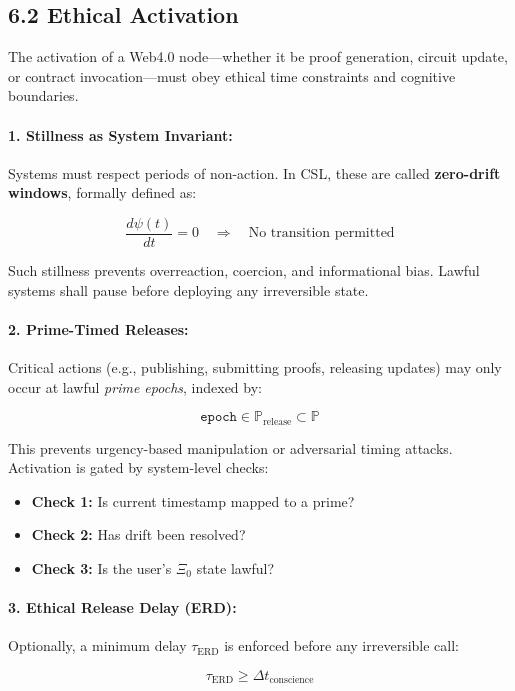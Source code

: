 \documentclass[12]{amsart}
\theoremstyle{plain}
\begin{document}
\subsection{6.2 Ethical Activation}
\label{subsec:ethical_activation}

The activation of a Web4.0 node—whether it be proof generation, circuit update, or contract invocation—must obey ethical time constraints and cognitive boundaries.

\paragraph{1. Stillness as System Invariant:}
Systems must respect periods of non-action. In CSL, these are called \textbf{zero-drift windows}, formally defined as:

\[
\frac{d\psi(t)}{dt} = 0 \quad \Rightarrow \quad \text{No transition permitted}
\]

Such stillness prevents overreaction, coercion, and informational bias. Lawful systems shall pause before deploying any irreversible state.

\paragraph{2. Prime-Timed Releases:}
Critical actions (e.g., publishing, submitting proofs, releasing updates) may only occur at lawful \textit{prime epochs}, indexed by:

\[
\texttt{epoch} \in \mathbb{P}_{\text{release}} \subset \mathbb{P}
\]

This prevents urgency-based manipulation or adversarial timing attacks. Activation is gated by system-level checks:

\begin{itemize}
  \item \textbf{Check 1:} Is current timestamp mapped to a prime?
  \item \textbf{Check 2:} Has drift been resolved?
  \item \textbf{Check 3:} Is the user’s $\Xi_0$ state lawful?
\end{itemize}

\paragraph{3. Ethical Release Delay (ERD):}
Optionally, a minimum delay $\tau_{\text{ERD}}$ is enforced before any irreversible call:

\[
\tau_{\text{ERD}} \geq \Delta t_{\text{conscience}}
\]
\end{document}
